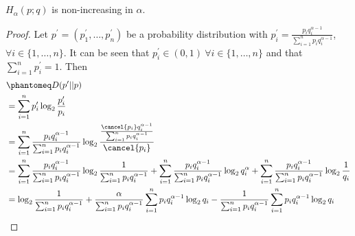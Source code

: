 \documentclass[
  coursecode={MTHE 474},
  assignmentname={Homework \homeworknumber},
  studentnumber=20053722,
  name={Bryan Hoang}
]{
  ltxanswer%
}
\begin{document}
\begin{questions}
\begin{parts}
      \part{}
      \begin{solution}
        \begin{claim}
          \(H_{\alpha}(p;q)\) is non-increasing in \(\alpha\).
        \end{claim}
        \begin{proof}
          Let \(p^{\prime} = (p_{1}^{\prime},\dotsc,p_{n}^{\prime})\) be a probability distribution with \(p_i^{\prime} = \frac{p_{i}q_{i}^{\alpha-1}}{\sum_{i=1}^{n} p_{i}q_{i}^{\alpha-1}}\), \(\forall i \in \{1, \dotsc, n\}\). It can be seen that \(p_{i}^{\prime} \in (0,1)\ \forall i \in \{1, \dotsc, n\}\) and that \(\sum_{i=1}^{n} p_{i}^{\prime} = 1\). Then
          \begin{align*}
             &\phantomeq D(p^{\prime}||p)                                                                                                                                                                                                                                                                                                                                          \\
             &= \sum_{i=1}^{n} p_{i}^{\prime} \log_{2} \frac{p_{i}^{\prime}}{p_{i}}                                                                                                                                                                                                                                                                                                \\
             &= \sum_{i=1}^{n} \frac{p_{i}q_{i}^{\alpha-1}}{\sum_{i=1}^{n} p_{i}q_{i}^{\alpha-1}} \log_{2}\frac{\frac{\cancel{p_{i}}q_{i}^{\alpha-1}}{\sum_{i=1}^{n} p_{i}q_{i}^{\alpha-1}} }{\cancel{p_{i}}}                                                                                                                                                                      \\
             &= \sum_{i=1}^{n} \frac{p_{i}q_{i}^{\alpha-1}}{\sum_{i=1}^{n} p_{i}q_{i}^{\alpha-1}} \log_{2} \frac{1}{\sum_{i=1}^{n} p_{i}q_{i}^{\alpha-1}} + \sum_{i=1}^{n} \frac{p_{i}q_{i}^{\alpha-1}}{\sum_{i=1}^{n} p_{i}q_{i}^{\alpha-1}} \log_{2} q_{i}^{\alpha} + \sum_{i=1}^{n} \frac{p_{i}q_{i}^{\alpha-1}}{\sum_{i=1}^{n} p_{i}q_{i}^{\alpha-1}} \log_{2} \frac{1}{q_{i}} \\
             &= \log_{2} \frac{1}{\sum_{i=1}^{n} p_{i}q_{i}^{\alpha-1}} + \frac{\alpha}{\sum_{i=1}^{n} p_{i}q_{i}^{\alpha-1}} \sum_{i=1}^{n} p_{i}q_{i}^{\alpha-1} \log_{2} q_{i} - \frac{1}{\sum_{i=1}^{n} p_{i}q_{i}^{\alpha-1}} \sum_{i=1}^{n} p_{i}q_{i}^{\alpha-1} \log_{2} q_{i}                                                                                             \\

\end{align*}
\end{proof}
\end{solution}
\end{parts}
\end{questions}
\end{document}
